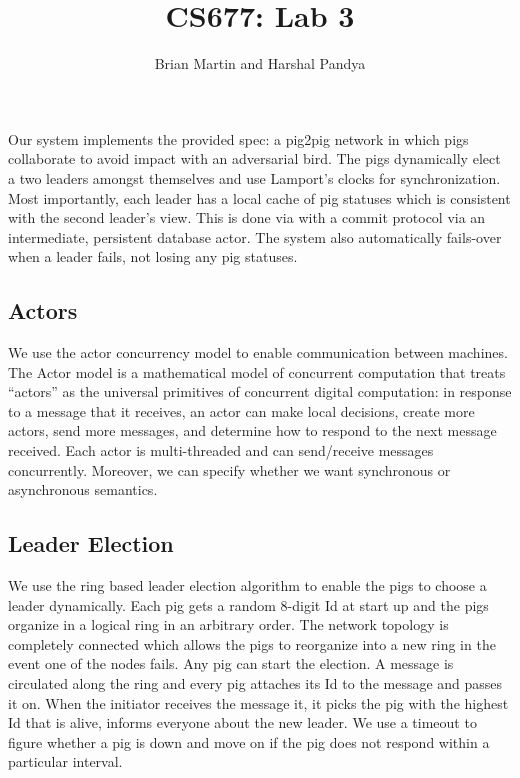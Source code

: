 \documentclass[]{article}
\title{CS677: Lab 3}
\author{Brian Martin and Harshal Pandya}
\date{}
\begin{document}
\maketitle

Our system implements the provided spec: a pig2pig network in which pigs
collaborate to avoid impact with an adversarial bird. The pigs dynamically
elect a two leaders amongst themselves and use Lamport's clocks for
synchronization. Most importantly, each leader has a local cache of pig
statuses which is consistent with the second leader's view. This is done via
with a commit protocol via an intermediate, persistent database actor. The
system also automatically fails-over when a leader fails, not losing any pig
statuses.

\subsection{Actors}
We use the actor concurrency model to enable communication between machines. The
Actor model is a mathematical model of concurrent computation that
treats ``actors'' as the universal primitives of concurrent digital
computation: in response to a message that it receives, an actor can
make local decisions, create more actors, send more messages, and
determine how to respond to the next message received. Each actor is multi-threaded 
and can send/receive messages concurrently. Moreover, we can specify whether we want 
synchronous or asynchronous semantics.

\subsection{Leader Election}
We use the ring based leader election algorithm to enable the pigs to choose a leader dynamically.
Each pig gets a random 8-digit Id at start up and the pigs organize in a logical ring in an arbitrary order.
The network topology is completely connected which allows the pigs to reorganize into a new ring in the
event one of the nodes fails. Any pig can start the election. A message is circulated along the ring and every 
pig attaches its Id to the message and passes it on. When the initiator receives the message it, it picks the 
pig with the highest Id that is alive, informs everyone about the new leader. We use a timeout to figure whether 
a pig is down and move on if the pig does not respond within a particular interval.
\end{document}
